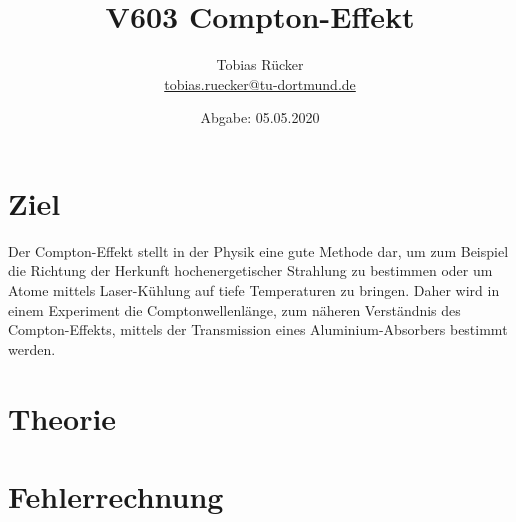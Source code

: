 


    \title{V603 Compton-Effekt}
    \author{  
    Tobias Rücker\\
    \texorpdfstring{\href{mailto:tobias.ruecker@tu-dortmund.de}{tobias.ruecker@tu-dortmund.de}}{}}
    
    \date{ Abgabe: 05.05.2020 \vspace{-4ex}}
\maketitle
\thispagestyle{empty}

\newpage
\tableofcontents
\thispagestyle{empty}
\newpage


\setcounter{page}{1}
\section{Ziel}\justifying

Der Compton-Effekt stellt in der Physik eine gute Methode dar, um zum Beispiel die Richtung der Herkunft hochenergetischer 
Strahlung zu bestimmen oder um Atome mittels Laser-Kühlung auf tiefe Temperaturen zu bringen. 
Daher wird in einem Experiment die Comptonwellenlänge, zum näheren Verständnis des Compton-Effekts,
mittels der Transmission eines Aluminium-Absorbers bestimmt werden.


\section{Theorie}\justifying


\section{Fehlerrechnung}\justifying

